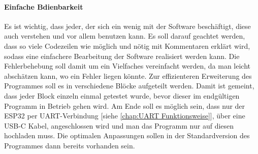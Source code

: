 \documentclass[titlepage,12pt,twoside]{article}
\begin{document}
\paragraph{Einfache Bdienbarkeit}
\hfill \break
\hfill \break
Es ist wichtig, dass jeder, der sich ein wenig mit der Software beschäftigt, diese auch verstehen und vor allem benutzen kann. 
Es soll darauf geachtet werden, dass so viele Codezeilen wie möglich und nötig mit Kommentaren erklärt wird, sodass eine 
einfachere Bearbeitung der Software realisiert werden kann. Die Fehlerbehebung soll damit um ein Vielfaches vereinfacht werden, 
da man leicht abschätzen kann, wo ein Fehler liegen könnte. Zur effizienteren Erweiterung des Programmes soll es in 
verschiedene Blöcke aufgeteilt werden. Damit ist gemeint, dass jeder Block einzeln einmal getestet wurde, bevor dieser im 
endgültigen Programm in Betrieb gehen wird. Am Ende soll es möglich sein, dass nur der ESP32 per UART-Verbindung [siehe \textcolor{blue}{\autoref{chap:UART Funktionsweise}}], über eine 
USB-C Kabel, angeschlossen wird und man das Programm nur auf diesen hochladen muss. Die optimalen Anpassungen sollen in der 
Standardversion des Programmes dann bereits vorhanden sein. \\
\\
\end{document}
